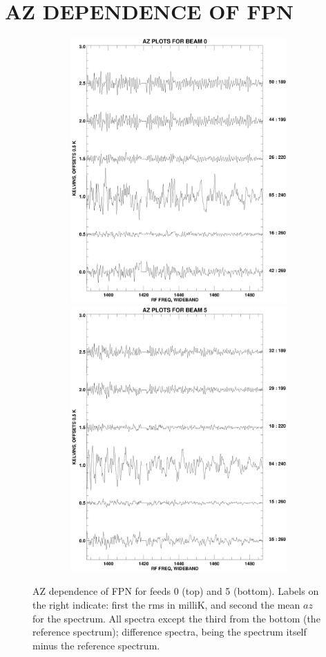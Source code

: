 \documentclass[psfig,preprint]{aastex}
\begin{document}
\section{AZ DEPENDENCE OF FPN} \label{az}

\begin{figure}[!p]
\begin{center}
\includegraphics[width=6in, height=4in]{azmmplot0.ps}   
\includegraphics[width=6in, height=4in]{azmmplot5.ps}   
\end{center}
\caption{AZ dependence of FPN for feeds 0 (top) and 5 (bottom). Labels on the right
indicate: first the rms in milliK, and second the mean $az$ for the spectrum.
All spectra except the third from the bottom (the reference spectrum); 
difference spectra, being the spectrum itself minus the reference spectrum.
\label{azmm05}}
\end{figure}
\end{document}
